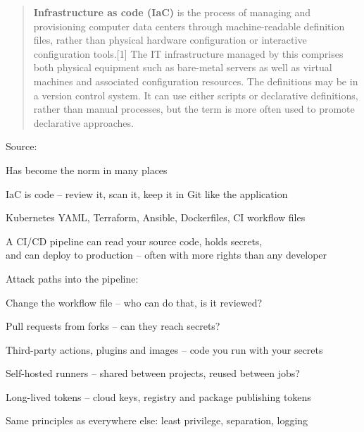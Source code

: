 \documentclass[Screen16to9,17pt]{foils}
\begin{document}



\begin{quote}
{\bf Infrastructure as code (IaC)} is the process of managing and provisioning computer data centers through machine-readable definition files, rather than physical hardware configuration or interactive configuration tools.[1] The IT infrastructure managed by this comprises both physical equipment such as bare-metal servers as well as virtual machines and associated configuration resources. The definitions may be in a version control system. It can use either scripts or declarative definitions, rather than manual processes, but the term is more often used to promote declarative approaches.
\end{quote}
Source: {\footnotesize
{}}

\begin{list2}
\item Has become the norm in many places
\item IaC is code -- review it, scan it, keep it in Git like the application
\item Kubernetes YAML, Terraform, Ansible, Dockerfiles, CI workflow files
\end{list2}



\begin{list1}
\item A CI/CD pipeline can read your source code, holds secrets,\\
and can deploy to production -- often with more rights than any developer
\item Attack paths into the pipeline:
\begin{list2}
\item Change the workflow file -- who can do that, is it reviewed?
\item Pull requests from forks -- can they reach secrets?
\item Third-party actions, plugins and images -- code you run with your secrets
\item Self-hosted runners -- shared between projects, reused between jobs?
\item Long-lived tokens -- cloud keys, registry and package publishing tokens
\end{list2}
\item Same principles as everywhere else: least privilege, separation, logging
\end{list1}
\end{document}
